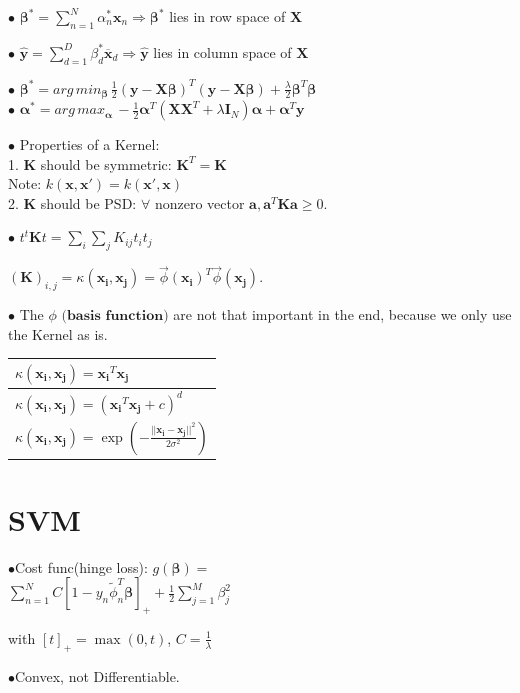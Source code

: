 \documentclass[10pt,a4paper,landscape]{article}
\renewcommand{\bf}[1]{\ensuremath{\mathbf{#1}}}
\newcommand{\bbeta}{\boldsymbol\beta}
\begin{document}
\begin{multicols*}{6}
$\bullet$ $\bbeta^* = \sum_{n=1}^N\alpha_n^*\bf{x}_n \Rightarrow\bbeta^*$ lies in row space of $\bf{X}$

$\bullet$ $\widehat{\bf{y}}=\sum_{d=1}^D\beta_d^*\overline{\bf{x}}_d\Rightarrow\widehat{\bf{y}}$ lies in column space of $\bf{X}$

$\bullet$ $\bbeta^* = arg\,min_{\bbeta}\,\frac{1}{2}(\bf{y}-\bf{X}\bbeta)^T(\bf{y}-\bf{X}\bbeta)+\frac{\lambda}{2}\bbeta^T\bbeta$\\
$\bullet$ $\boldsymbol\alpha^* = arg\,max_{\boldsymbol\alpha} \, -\frac{1}{2}\boldsymbol\alpha^T(\bf{XX}^T+\lambda\bf{I}_N)\boldsymbol\alpha+\boldsymbol\alpha^T\bf{y}$

$\bullet$ Properties of a Kernel:\\
1. $\bf{K}$ should be symmetric: $\bf{K}^T = \bf{K}$\\
  Note: $k(\bf{x}, \bf{x}')=k(\bf{x}', \bf{x})$\\
2. $\bf{K}$ should be PSD: $\forall$ nonzero vector $\bf{a}, \bf{a}^T \bf{K} \bf{a} \geq 0$.

$\bullet$ $t^t\bf{K}t=\sum_i\sum_jK_{ij}t_it_j$


$(\bf{K})_{i,j} = \kappa(\bf{x_i}, \bf{x_j}) = \vec \phi(\bf{x_i})^T \vec \phi(\bf{x_j})$.

$\bullet$ The $\phi$ $\textbf{(basis function)}$ are not that important in the end, because we only use the Kernel as is. 

\begin{tabular}{  | l |}
  \hline
$\kappa(\bf{x_i}, \bf{x_j}) = \bf{x_i}^T \bf{x_j}$ \\
  \hline
$\kappa(\bf{x_i}, \bf{x_j}) = (\bf{x_i}^T \bf{x_j} + c)^d$ \\
  \hline
 $\kappa(\bf{x_i}, \bf{x_j}) = \exp\left(-\frac{||\bf{x_i} - \bf{x_j}||^2}{2\sigma^2}\right)$ \\
  \hline
\end{tabular}



\section{SVM}
$\bullet$Cost func(hinge loss):
$g(\bbeta)=$\\
$ \sum_{n=1}^N C[1 - y_n \tilde\phi_n^T \bbeta]_{+} + \frac{1}{2} \sum_{j=1}^M \beta_j^2$

with $[t]_{+} = \max(0, t)$, $C=\frac{1}{\lambda}$ 

$\bullet$Convex, not Differentiable. 


\end{multicols*}
\end{document}
